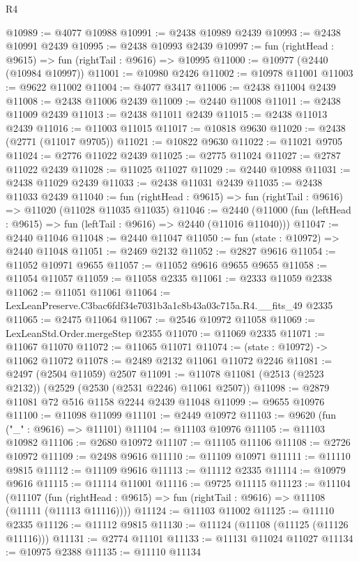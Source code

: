 \begin{lexlean}{R4}
\begin{coremodule}
@10989 := @4077 @10988
@10991 := @2438 @10989 @2439
@10993 := @2438 @10991 @2439
@10995 := @2438 @10993 @2439
@10997 := fun (rightHead : @9615) => fun (rightTail : @9616) => @10995
@11000 := @10977 (@2440 (@10984 @10997))
@11001 := @10980 @2426
@11002 := @10978 @11001
@11003 := @9622 @11002
@11004 := @4077 @3417
@11006 := @2438 @11004 @2439
@11008 := @2438 @11006 @2439
@11009 := @2440 @11008
@11011 := @2438 @11009 @2439
@11013 := @2438 @11011 @2439
@11015 := @2438 @11013 @2439
@11016 := @11003 @11015
@11017 := @10818 @9630
@11020 := @2438 (@2771 (@11017 @9705))
@11021 := @10822 @9630
@11022 := @11021 @9705
@11024 := @2776 @11022 @2439
@11025 := @2775 @11024
@11027 := @2787 @11022 @2439
@11028 := @11025 @11027
@11029 := @2440 @10988
@11031 := @2438 @11029 @2439
@11033 := @2438 @11031 @2439
@11035 := @2438 @11033 @2439
@11040 := fun (rightHead : @9615) => fun (rightTail : @9616) => @11020 (@11028 @11035 @11035)
@11046 := @2440 (@11000 (fun (leftHead : @9615) => fun (leftTail : @9616) => @2440 (@11016 @11040)))
@11047 := @2440 @11046
@11048 := @2440 @11047
@11050 := fun (state : @10972) => @2440 @11048
@11051 := @2469 @2132
@11052 := @2827 @9616
@11054 := @11052 @10971 @9655
@11057 := @11052 @9616 @9655 @9655
@11058 := @11054 @11057
@11059 := @11058 @2335
@11061 := @2333 @11059 @2338
@11062 := @11051 @11061
@11064 := LexLeanPreserve.C3bac6fdf34e7031b3a1c8b43a03c715a.R4.__fits_49 @2335
@11065 := @2475 @11064
@11067 := @2546 @10972 @11058
@11069 := LexLeanStd.Order.mergeStep @2355
@11070 := @11069 @2335
@11071 := @11067 @11070
@11072 := @11065 @11071
@11074 := (state : @10972) -> @11062 @11072
@11078 := @2489 @2132 @11061 @11072 @2246
@11081 := @2497 (@2504 @11059) @2507
@11091 := @11078 @11081 (@2513 (@2523 @2132)) (@2529 (@2530 (@2531 @2246) @11061 @2507))
@11098 := @2879 @11081 @72 @516 @1158 @2244 @2439 @11048
@11099 := @9655 @10976
@11100 := @11098 @11099
@11101 := @2449 @10972
@11103 := @9620 (fun ("_" : @9616) => @11101)
@11104 := @11103 @10976
@11105 := @11103 @10982
@11106 := @2680 @10972
@11107 := @11105 @11106
@11108 := @2726 @10972
@11109 := @2498 @9616
@11110 := @11109 @10971
@11111 := @11110 @9815
@11112 := @11109 @9616
@11113 := @11112 @2335
@11114 := @10979 @9616
@11115 := @11114 @11001
@11116 := @9725 @11115
@11123 := @11104
    (@11107 (fun (rightHead : @9615) => fun (rightTail : @9616) => @11108 (@11111 (@11113 @11116))))
@11124 := @11103 @11002
@11125 := @11110 @2335
@11126 := @11112 @9815
@11130 := @11124 (@11108 (@11125 (@11126 @11116)))
@11131 := @2774 @11101
@11133 := @11131 @11024 @11027
@11134 := @10975 @2388
@11135 := @11110 @11134

\end{coremodule}
\end{lexlean}
